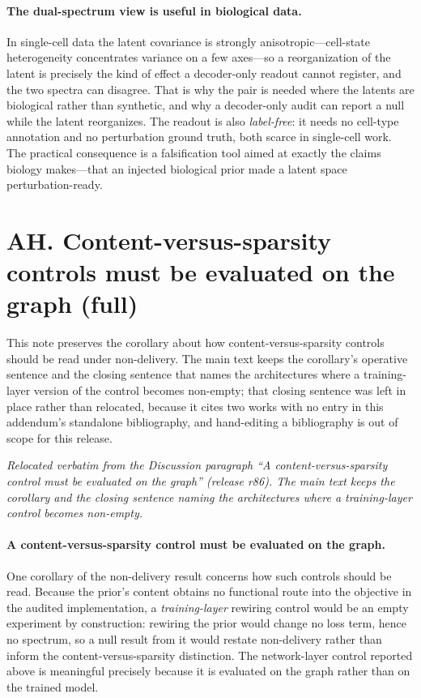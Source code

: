 \documentclass[11 pt,a4 paper]{article}
\begin{document}
\paragraph*{The dual-spectrum view is useful in biological data.}
In single-cell data the latent covariance is strongly anisotropic---cell-state heterogeneity concentrates variance on a few axes---so a reorganization of the latent is precisely the kind of effect a decoder-only readout cannot register, and the two spectra can disagree. That is why the pair is needed where the latents are biological rather than synthetic, and why a decoder-only audit can report a null while the latent reorganizes. The readout is also \emph{label-free}: it needs no cell-type annotation and no perturbation ground truth, both scarce in single-cell work. The practical consequence is a falsification tool aimed at exactly the claims biology makes---that an injected biological prior made a latent space perturbation-ready.

\clearpage

\section*{AH. Content-versus-sparsity controls must be evaluated on the graph (full)}

This note preserves the corollary about how content-versus-sparsity controls should be read
under non-delivery. The main text keeps the corollary's operative sentence and the closing
sentence that names the architectures where a training-layer version of the control becomes
non-empty; that closing sentence was left in place rather than relocated, because it cites two
works with no entry in this addendum's standalone bibliography, and hand-editing a bibliography
is out of scope for this release.

\noindent\emph{Relocated verbatim from the Discussion paragraph ``A content-versus-sparsity control must be evaluated on the graph'' (release r86). The main text keeps the corollary and the closing sentence naming the architectures where a training-layer control becomes non-empty.}

\paragraph*{A content-versus-sparsity control must be evaluated on the graph.}
One corollary of the non-delivery result concerns how such controls should be read. Because the prior's content obtains no functional route into the objective in the audited implementation, a \emph{training-layer} rewiring control would be an empty experiment by construction: rewiring the prior would change no loss term, hence no spectrum, so a null result from it would restate non-delivery rather than inform the content-versus-sparsity distinction. The network-layer control reported above is meaningful precisely because it is evaluated on the graph rather than on the trained model.
\end{document}

